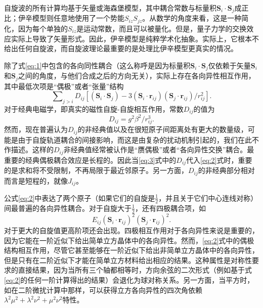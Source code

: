 \documentclass{article}
\begin{document}
自旋波的所有计算均基于矢量或海森堡模型，其中耦合常数与标量积$\mathbf{S}_{i}\cdot\mathbf{S}_{j}$成正比；伊辛模型则任意地使用了一个势能$S_{iz}S_{jz}$。从数学的角度来看，这是一种简化，因为每个单独的$S_{iz}$是运动常数，而且可以被量化。但是，量子力学的交换效应实际上导致了矢量形式。因此，伊辛模型是纯粹学术化抽象。实际上，它根本不给出任何自旋波，而自旋波理论最重要的是处理比伊辛模型更真实的情况。

除了式\eqref{eq:1}中包含的各向同性耦合（这么称呼是因为标量积$\mathbf{S}_{i}\cdot\mathbf{S}_{j}$仅依赖于矢量$\mathbf{S}_i$和$\mathbf{S}_j$之间的角度，与他们合成之后的方向无关），实际上存在各向异性相互作用，其中最低次项是“偶极”或者“张量”结构
\begin{equation} \label{eq:2}
\sum\nolimits_{j>i}D_{\mathit{ij}}[(\mathbf{S}_i\cdot\mathbf{S}_j)-3(\mathbf{S}_i\cdot\mathbf{r}_{\mathit{ij}})(\mathbf{S}_j\cdot\mathbf{r}_{\mathit{ij}})/r_{\mathit{ij}}^2].
\end{equation}
对于经典电磁学，即真实的磁性自旋-自旋相互作用，常数$D_{ij}$的值为
\begin{equation} \label{eq:3} 
D_{\mathit{ij}}=g^2\beta^2/r_\mathit{ij}^3.
\end{equation}
然而，现在普遍认为$D_{ij}$的非经典值以及在很短原子间距离处有更大的数量级，可能是由于自旋轨道耦合的间接影响，而这是由复杂的扰动机制引起的，我们在此不作描述。这样的$D_{ij}$非经典值经常被认作是“赝偶极”或者“各向异性交换”耦合。最重要的经典偶极耦合效应是长程的。因此当\eqref{eq:3}式中的$D_{ij}$代入\eqref{eq:2}式时，重要的是求和将不受限制，不再局限于最近邻原子。另一方面，$D_{ij}$的非经典部分相对而言是短程的，就像$J_{ij}$。

公式\eqref{eq:2}中表达了两个原子（如果它们的自旋是$\frac{1}{2}$，并且关于它们中心连线对称）间最普遍的各向异性耦合。对于自旋大于$\frac{1}{2}$，还有四极耦合项，如
\begin{equation*}
E_\mathit{ij}(\mathbf{S}_i\cdot\mathbf{r}_\mathit{ij})^2(\mathbf{S}_j\cdot\mathbf{r}_\mathit{ij})^2.
\end{equation*}
对于更大的自旋值更高阶项还会出现。四极相互作用对于各向异性来说是重要的，因为它能在一阶近似下给出简单立方晶体中的各向异性。然而，\eqref{eq:2}式中的偶极结构相互作用，尽管它甚至能够在一阶近似下给出非简单立方晶体中的各向异性，但是只有在二阶近似下才能在简单立方材料给出相应的结果。这种属性是对称性要求的直接结果，因为当所有三个轴都相等时，方向余弦的二次形式（例如基于式\eqref{eq:2}的任何一阶计算得出的结果）会退化为球对称关系。另一方面，当平方时，如在二阶微扰计算中那样，可以获得立方各向异性的四次角依赖$\lambda^2\mu^2+\lambda^2\nu^2+\mu^2\nu^2$特性。
\end{document}
